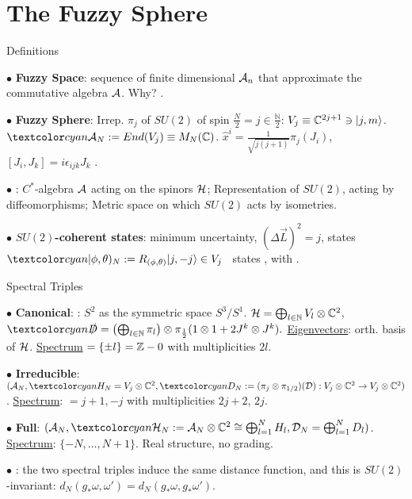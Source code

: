 \section{The Fuzzy Sphere}

\begin{frame}{Definitions} %
    
    $\bullet$ \textbf{Fuzzy Space}: %
    sequence of finite dimensional $\mathcal A_n$ that approximate the commutative algebra $\mathcal A$. Why? .
    
    $\bullet$ \textbf{Fuzzy Sphere}: Irrep. $\pi_j$ of $SU(2)$ of spin $\frac{N}{2} = j \in \frac{\mathbb N}{2}$: $V_j \equiv \mathbb C^{2j+1} \ni |j, m\rangle$. $\lbtext{\acal_N}:= End(V_j) \equiv M_N(\CC)$. $\hat x^i = \frac{1}{\sqrt{j(j+1)}} \pi_{j}(J_i)$, $[J_i, J_k] = i \epsilon_{ijk} J_k$ \then {}.
    
    $\bullet$ :  $C^*$-algebra $\mathcal A$ acting on the spinors $\mathcal H$;  Representation of $SU(2)$, acting by diffeomorphisms;   Metric space on which $SU(2)$ acts by isometries.
    
    $\bullet$ \textbf{$SU(2)$-coherent states}: minimum uncertainty, $(\Delta \vec L)^2=j$, states $\lbtext{|\phi, \theta)_N} := R_{(\phi, \theta)}|j, -j\rangle \in V_j$ \iff\ states  , with .
    
\end{frame}


\begin{frame}{Spectral Triples} %
    
     $\bullet$ \textbf{Canonical}: : $S^2$ as the symmetric space $S^3/S^1$. $\mathcal H = \bigoplus_{l \in \mathbb N} V_l \otimes \mathbb C^2$, $\lbtext{\slashed D} = \left( \bigoplus_{l \in \NN} \pi_l \right) \otimes \pi_{\frac{1}{2}}(1\otimes 1 + 2 J^k \otimes J^k).$ \underline{Eigenvectors}: orth. basis of $\mathcal H$. \underline{Spectrum} $= \{\pm l\} = \mathbb Z - 0$ with multiplicities $2l$.
     
     $\bullet$ \textbf{Irreducible}: $(\acal_N, \lbtext{H_N} = V_j \otimes \CC^2, \lbtext{D_N} 
    := (\pi_j \otimes \pi_{1/2})(\mathcal D): V_j \otimes \CC^2 \to V_j \otimes \CC^2)$. \underline{Spectrum}: $= j+1, -j$ with multiplicities $2j+2$, $2j$. 
     
     $\bullet$ \textbf{Full}: $(\acal_N, \lbtext{\hcal_N} := \mathcal A_N \otimes \CC^2 \cong \bigoplus_{l =1}^N H_l, \mathcal D_N = \bigoplus_{l =1}^N D_l)$. \underline{Spectrum}: $\{-N, \dots, N+1\}$. Real structure, no grading.
     
     $\bullet$ \textbf{}: the two spectral triples induce the same distance function, and this is $SU(2)$-invariant: $d_N(g_* \omega, \omega') = d_N(g_* \omega, g_*\omega')$.
    
\end{frame}


